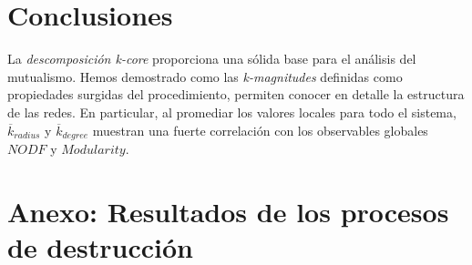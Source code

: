 \clearpage
\section{Conclusiones}

La \textit{descomposición k-core} proporciona una sólida base para el análisis del mutualismo. Hemos demostrado como las \textit{k-magnitudes} definidas como propiedades surgidas del procedimiento, permiten conocer en detalle la estructura de las redes. En particular, al promediar los valores locales para todo el sistema, $\overline {k}_{radius}$ y $\overline {k}_{degree}$ muestran una fuerte correlación con los observables globales $NODF$ y $Modularity$. 

\clearpage

\section{Anexo: Resultados de los procesos de destrucción}
\label{DES_ANEXO_halfgc}

